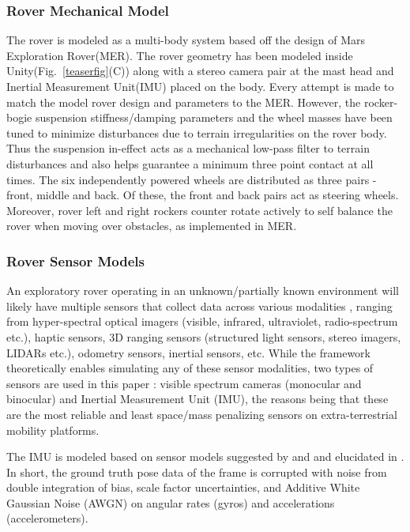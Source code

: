 \documentclass[a4paper, 10pt, conference]{ieeeconf}      %
\begin{document}
\subsubsection{Rover Mechanical Model}
The rover is modeled as a multi-body system based off the design of Mars Exploration Rover(MER). The rover geometry has been modeled inside Unity(Fig.~\ref{teaserfig}(C)) along with a stereo camera pair at the mast head and Inertial Measurement Unit(IMU) placed on the body. Every attempt is made to match the model rover design and parameters to the MER\cite{crisp2003mars,maki2003mars}. However, the rocker-bogie suspension stiffness/damping parameters and the wheel masses have been tuned to minimize disturbances due to terrain irregularities on the rover body. Thus the suspension in-effect acts as a mechanical low-pass filter to terrain disturbances and also helps guarantee a minimum three point contact at all times. The six independently powered wheels are distributed as three pairs - front, middle and back. Of these, the front and back pairs act as steering wheels. Moreover, rover left and right rockers counter rotate actively to self balance the rover when moving over obstacles, as implemented in MER.
\subsubsection{Rover Sensor Models}
An exploratory rover operating in an unknown/partially known environment will likely have multiple sensors that collect data across various modalities \cite{borenstein1997mobile,ruocco2013robot}, ranging from hyper-spectral optical imagers (visible, infrared, ultraviolet, radio-spectrum etc.), haptic sensors, 3D ranging sensors (structured light sensors, stereo imagers, LIDARs etc.), odometry sensors, inertial sensors, etc. While the framework theoretically enables simulating any of these sensor modalities, two types of sensors are used in this paper : visible spectrum cameras (monocular and binocular)  and Inertial Measurement Unit (IMU), the reasons being that these are the most reliable and least space/mass penalizing sensors on extra-terrestrial mobility platforms. 

The IMU is modeled based on sensor models suggested by \cite{savage1998strapdown1} and \cite{savage1998strapdown2} and elucidated in \cite{titterton2004strapdown}. In short, the ground truth pose data of the frame is corrupted with noise from double integration of bias, scale factor uncertainties, and Additive White Gaussian Noise (AWGN) on angular rates (gyros) and accelerations (accelerometers).
\end{document}
